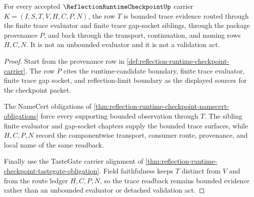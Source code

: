 \begin{theorem}
\label{thm:reflection-runtime-checkpoint-trace-boundary-readback}
For every accepted $\ReflectionRuntimeCheckpointUp$ carrier $K=(I,S,T,V,H,C,P,N)$, the row $T$ is bounded trace evidence routed through the finite trace evaluator and finite trace gap-socket siblings, through the package provenance $P$, and back through the transport, continuation, and naming rows $H,C,N$. It is not an unbounded evaluator and it is not a validation act.
\end{theorem}
\begin{proof}
Start from the provenance row in \autoref{def:reflection-runtime-checkpoint-carrier}. The row $P$ cites the runtime-candidate boundary, finite trace evaluator, finite trace gap socket, and reflection-limit boundary as the displayed sources for the checkpoint packet.

The NameCert obligations of \autoref{thm:reflection-runtime-checkpoint-namecert-obligations} force every supporting bounded observation through $T$. The sibling finite evaluator and gap-socket chapters supply the bounded trace surfaces, while $H,C,P,N$ record the componentwise transport, consumer route, provenance, and local name of the same readback.

Finally use the TasteGate carrier alignment of \autoref{thm:reflection-runtime-checkpoint-tastegate-obligation}. Field faithfulness keeps $T$ distinct from $V$ and from the route ledger $H,C,P,N$, so the trace readback remains bounded evidence rather than an unbounded evaluator or detached validation act.
\end{proof}

